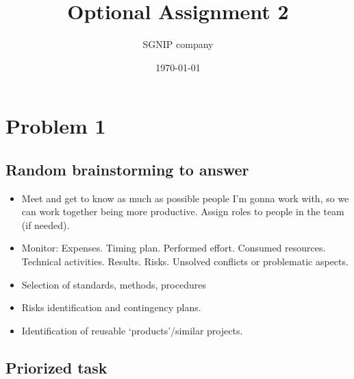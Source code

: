 \documentclass{article}
\title{Optional Assignment 2}
\date{\today}
\author{SGNIP company}
\begin{document}
\maketitle

\newpage

\section{Problem 1}

\subsection{Random brainstorming to answer}

\begin{itemize}
	\item Meet and get to know as much as possible people I'm gonna work with, so we can work together being more productive.
	\subitem Assign roles to people in the team (if needed).
	\item Monitor:
	\subitem	Expenses.
	\subitem Timing plan.
	\subitem Performed effort.
	\subitem Consumed resources.
	\subitem Technical	activities.
	\subitem Results.
	\subitem Risks.
	\subitem Unsolved conflicts or problematic aspects.
	\item Selection of standards, methods, procedures
	\item Risks identification and contingency plans.
	\item Identification of reusable ‘products’/similar projects.
	
\end{itemize}

\subsection{Priorized task}
\end{document}
